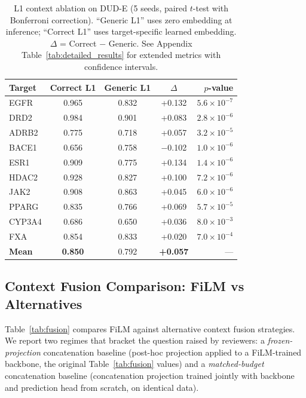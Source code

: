 \documentclass[sigconf]{acmart}
\begin{document}
\begin{table}[t]
\caption{L1 context ablation on DUD-E (5 seeds, paired $t$-test with Bonferroni correction). ``Generic L1'' uses zero embedding at inference; ``Correct L1'' uses target-specific learned embedding. $\Delta$ = Correct $-$ Generic. See Appendix Table~\ref{tab:detailed_results} for extended metrics with confidence intervals.}
\label{tab:l1_ablation}
\centering
\small
\begin{tabular}{@{}lcccr@{}}
\toprule
Target & Correct L1 & Generic L1 & $\Delta$ & $p$-value \\
\midrule
EGFR & 0.965 & 0.832 & +0.132 & $5.6 \times 10^{-7}$ \\
DRD2 & 0.984 & 0.901 & +0.083 & $2.8 \times 10^{-6}$ \\
ADRB2 & 0.775 & 0.718 & +0.057 & $3.2 \times 10^{-5}$ \\
BACE1 & 0.656 & 0.758 & $-$0.102 & $1.0 \times 10^{-6}$ \\
ESR1 & 0.909 & 0.775 & +0.134 & $1.4 \times 10^{-6}$ \\
HDAC2 & 0.928 & 0.827 & +0.100 & $7.2 \times 10^{-6}$ \\
JAK2 & 0.908 & 0.863 & +0.045 & $6.0 \times 10^{-6}$ \\
PPARG & 0.835 & 0.766 & +0.069 & $5.7 \times 10^{-5}$ \\
CYP3A4 & 0.686 & 0.650 & +0.036 & $8.0 \times 10^{-3}$ \\
FXA & 0.854 & 0.833 & +0.020 & $7.0 \times 10^{-4}$ \\
\midrule
\textbf{Mean} & \textbf{0.850} & 0.792 & \textbf{+0.057} & --- \\
\bottomrule
\end{tabular}
\end{table}

\subsection{Context Fusion Comparison: FiLM vs Alternatives}
\label{sec:fair_fusion}

Table~\ref{tab:fusion} compares FiLM against alternative context fusion strategies. We report two regimes that bracket the question raised by reviewers: a \emph{frozen-projection} concatenation baseline (post-hoc projection applied to a FiLM-trained backbone, the original Table~\ref{tab:fusion} values) and a \emph{matched-budget} concatenation baseline (concatenation projection trained jointly with backbone and prediction head from scratch, on identical data).
\end{document}
